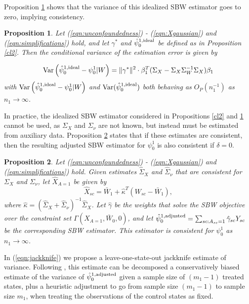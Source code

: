 \documentclass[aoas]{imsart}
\theoremstyle{plain}
\newtheorem{proposition}{Proposition}
\theoremstyle{remark}
\begin{document}
\begin{appendix}
Proposition \ref{prop:variance_rate} shows that the variance of this idealized SBW estimator goes to zero, implying consistency. 
\begin{proposition}\label{prop:variance_rate}
Let (\ref{eqn:unconfoundedness}) - (\ref{eqn:Xgaussian}) and (\ref{eqn:simplifications}) hold, and let $\gamma^*$ and $\hat{\psi}_0^{1, \textup{ideal}}$ be defined as in Proposition \ref{cl2}. Then the conditional variance of the estimation error is given by

\begin{align*}
\operatorname{Var}\left( \hat{\psi}_0^{1, \textup{ideal}} - \psi_0^1| W\right)  = \|\gamma^*\|^2 \cdot \beta_1^T(\Sigma_{X} - \Sigma_{X}\Sigma_{W}^{-1}\Sigma_{X})\beta_1
\end{align*}
with $\operatorname{Var}\left( \hat{\psi}_0^{1, \textup{ideal}} - \psi_0^1| W\right)$ and $\operatorname{Var}(\hat{\psi}_0^{1,\textup{ideal}})$ both behaving as $O_P(n_1^{-1})$ as $n_1 \rightarrow \infty$.
\end{proposition}

In practice, the idealized SBW estimator considered in Propositions \ref{cl2} and \ref{prop:variance_rate} cannot be used, as $\Sigma_X$ and $\Sigma_{\nu}$ are not known, but instead must be estimated from auxiliary data. Proposition \ref{cl3} states that if these estimates are consistent, then the resulting adjusted SBW estimator for $\psi_0^1$ is also consistent if $\delta = 0$.

\begin{proposition}\label{cl3}
Let (\ref{eqn:unconfoundedness}) - (\ref{eqn:Xgaussian}) and (\ref{eqn:simplifications}) hold. Given estimates $\hat{\Sigma}_X$ and $\hat{\Sigma}_\nu$ that are consistent for $\Sigma_X$ and $\Sigma_\nu$, let $\hat{X}_{A=1}$ be given by 
\[ \hat{X}_{sc} = \bar{W}_1 + \hat{\kappa}^T(W_{sc} - \bar{W}_1), \]
where $\hat{\kappa} = (\hat{\Sigma}_X + \hat{\Sigma}_{\nu})^{-1} \hat{\Sigma}_X$. Let $\hat{\gamma}$ be the weights that solve the SBW objective over the constraint set $\Gamma(\hat{X}_{A=1}, \bar{W}_0, 0)$, and let $\hat{\psi}^{1, \textup{adjusted}}_0 = \sum_{sc: A_{sc} = 1} \hat{\gamma}_{sc} Y_{sc}$ be the corresponding SBW estimator. This estimator is consistent for $\psi_0^1$ as $n_1 \to \infty$.
\end{proposition}

In (\ref{eqn:jackknife}) we propose a leave-one-state-out jackknife estimate of variance. Following \cite{efron1981jackknife}, this estimate can be decomposed a conservatively biased estimate of the variance of $\hat{\psi}_0^{1, \textup{adjusted}}$ given a sample size of $(m_1-1)$ treated states, plus a heuristic adjustment to go from sample size $(m_1-1)$ to sample size $m_1$, when treating the observations of the control states as fixed.


\end{appendix}
\end{document}
